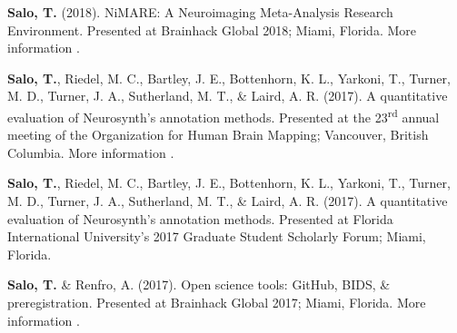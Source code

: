 \documentclass[10pt]{article}
\newcommand{\sectionstyle}{\LARGE \fontfamily{lmr}\selectfont}
\newcommand{\textlink}[3][blue]{\href{#2}{\color{#1}{#3}}}
\begin{document}
	\begin{hangparas}{.25in}{1}
	\textbf{Salo, T.} (2018).
	NiMARE: A Neuroimaging Meta-Analysis Research Environment.
	Presented at Brainhack Global 2018; Miami, Florida. More
	information \textlink{https://www.slideshare.net/TaylorSalo/nimarebrainhackglobalmiami}{here}.

	\bigskip

	\textbf{Salo, T.}, Riedel, M. C., Bartley, J. E., Bottenhorn, K. L., Yarkoni, T.,
	Turner, M. D., Turner, J. A., Sutherland, M. T., \& Laird, A. R. (2017).
	A quantitative evaluation of Neurosynth's annotation methods. Presented at
	the 23\textsuperscript{rd} annual meeting of the Organization for Human Brain
	Mapping; Vancouver, British Columbia. More information
	\textlink{https://nbclab.github.io/presentations/salo-neurosynth-presentation}{here}.

	\bigskip

	\textbf{Salo, T.}, Riedel, M. C., Bartley, J. E., Bottenhorn, K. L., Yarkoni, T.,
	Turner, M. D., Turner, J. A., Sutherland, M. T., \& Laird, A. R. (2017).
	A quantitative evaluation of Neurosynth's annotation methods. Presented at
	Florida International University's 2017 Graduate Student Scholarly Forum;
	Miami, Florida.

	\bigskip

	\textbf{Salo, T.} \& Renfro, A. (2017). Open science tools: GitHub, BIDS, \&
	preregistration. Presented at Brainhack Global 2017; Miami, Florida. More
	information \textlink{https://osf.io/557vf}{here}.

\end{hangparas}

\bigskip

\begin{center}\sectionstyle{POSTERS}\end{center}
\end{document}

